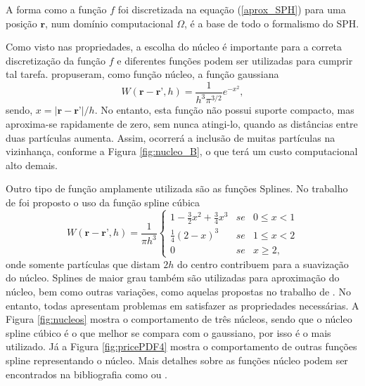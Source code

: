 A forma como a função $f$ foi discretizada na equação (\ref{aprox_SPH}) para uma posição $\textbf{r}$, num domínio computacional $\Omega$, é a base de todo o formalismo do SPH.

Como visto nas propriedades, a escolha do núcleo é importante para a correta discretização da função $f$ e diferentes funções podem ser utilizadas para cumprir tal tarefa.  propuseram, como função núcleo, a função gaussiana
\begin{equation}
W(\textbf{r} - \textbf{r'},h) = \frac{1}{h^{3} \pi^{3/2}} e^{-x^{2}},
\end{equation}
sendo, $x = {| \textbf{r} - \textbf{r'}|}/{h}$. No entanto, esta função não possui suporte compacto, mas aproxima-se rapidamente de zero, sem nunca atingi-lo, quando as distâncias entre duas partículas aumenta. Assim, ocorrerá a inclusão de muitas partículas na vizinhança, conforme a Figura \ref{fig:nucleo_B}, o que terá um custo computacional alto demais.

Outro tipo de função amplamente utilizada são as funções Splines. No trabalho de  foi proposto o uso da função spline cúbica  
\begin{equation}
W(\textbf{r} - \textbf{r'},h) = \frac{1}{\pi h^{3}} \left\{
\begin{array}{rcl}
1 - \frac{3}{2} x^{2} + \frac{3}{4} x^{3} & se & 0 \leq x < 1 \\
\frac{1}{4}(2-x)^{3} & se & 1 \leq x < 2 \\
0 & se & x \geq 2,  
\end{array} \right.
\end{equation}
onde somente partículas que distam $2h$ do centro contribuem para a suavização do núcleo. Splines de maior grau também são utilizadas para aproximação do núcleo, bem como outras variações, como aquelas propostas no trabalho de . No entanto, todas apresentam problemas em satisfazer as propriedades necessárias. A Figura \ref{fig:nucleos} mostra o comportamento de três núcleos, sendo que o núcleo spline cúbico é o que melhor se compara com o gaussiano, por isso é o mais utilizado. Já a Figura \ref{fig:pricePDF4} mostra o comportamento de outras funções spline representando o núcleo. Mais detalhes sobre as funções núcleo podem ser encontrados na bibliografia como  ou  .

